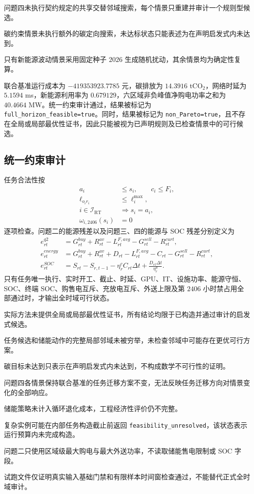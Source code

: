 问题四未执行契约规定的共享交替邻域搜索，每个情景只重建并审计一个规则型候选。

碳约束情景未执行额外的碳定向搜索，未达标状态只能表述为在声明启发式内未达到。

只有新能源波动情景采用固定种子 $2026$ 生成随机扰动，其余情景均为确定性复算。

联合基准运行成本为 $-419353923.7785$ 元，碳排放为 $14.3916$ tCO$_2$，网络时延为 $5.1594$ ms，新能源利用率为 $0.679129$，六区域非负峰值净购电功率之和为 $40.4664$ MW。统一约束审计通过，结果被标记为 \texttt{full\_horizon\_feasible=true}。同时，结果被标记为 \texttt{non\_Pareto=true}，且不存在全局或局部最优性证书，因此只能被视为已声明规则及已检查情景中的可行候选。

\subsection{统一约束审计}

任务合法性按
\begin{align}
a_i&\le s_i,\qquad c_i\le F_i,\\
\ell_{o_ir_i}&\le\ell_i^{\max},\\
i\in\mathcal I_{\mathrm{RT}}&\Rightarrow s_i=a_i,\\
\omega_{i,2406}(s_i)&=0
\end{align}
逐项检查。问题二的能源残差以及问题三、四的能源与 SOC 残差分别定义为
\begin{align}
e_{rt}^{q2}
&=G_{rt}^{buy}+R_{rt}^{av}
-L_{rt}^{F,avg}-G_{rt}^{sell}-R_{rt}^{curt},\\
e_{rt}^{energy}
&=G_{rt}^{buy}+R_{rt}^{av}+D_{rt}
-L_{rt}^{F,avg}-C_{rt}-G_{rt}^{sell}-R_{rt}^{curt},\\
e_{rt}^{SOC}
&=S_{rt}-S_{r,t-1}-\eta_r^cC_{rt}\Delta t
+\frac{D_{rt}\Delta t}{\eta_r^d}.
\end{align}
只有任务唯一执行、实时开工、截止、时延、GPU、IT、设施功率、能源守恒、SOC、终端 SOC、购售电互斥、充放电互斥、外送上限及第 $2406$ 小时禁占用全部通过时，才输出全时域可行状态。

实际方法未提供全局或局部最优性证书，所有结论均限于已构造并通过审计的启发式候选。

任务候选和储能动作的完整局部邻域未被穷举，未检查邻域中可能存在更优可行方案。

碳目标未达到只表示在声明启发式内未达到，不构成数学不可行性的证明。

问题四各情景保持联合基准的任务迁移方案不变，无法反映任务迁移方向对情景变化的全部响应。

储能策略未计入循环退化成本，工程经济性评价仍不完整。

复杂实例可能在内部任务构造截止前返回 \texttt{feasibility\_unresolved}，该状态表示运行预算内未完成构造。

问题二只使用区域级最大购电与最大外送功率，不读取储能售电限制或 SOC 字段。

试跑文件仅证明真实输入基础门禁和有限样本时间窗检查通过，不能替代正式全时域审计。
